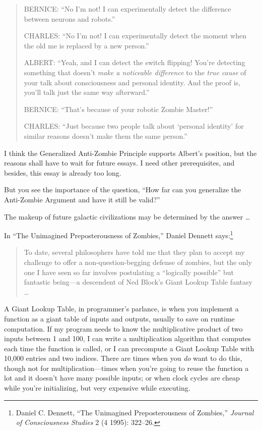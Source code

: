 \begin{quotation}
{
 BERNICE: ``No I'm not! I can
experimentally detect the difference between neurons and
robots.''}

{
 CHARLES: ``No I'm not! I can
experimentally detect the moment when the old me is replaced by a new
person.''}

{
 ALBERT: ``Yeah, and I can detect the switch
flipping! You're detecting something that
doesn't \textit{make a noticeable difference} to the
\textit{true cause} of your talk about consciousness and personal
identity. And the proof is, you'll talk just the same
way afterward.''}

{
 BERNICE: ``That's because of your
robotic Zombie Master!''}

{
 CHARLES: ``Just because two people talk about
`personal identity' for similar reasons
 doesn't make them the same person.''}
\end{quotation}

{
 I think the Generalized Anti-Zombie Principle supports
Albert's position, but the reasons shall have to wait
for future essays. I need other prerequisites, and besides, this essay
is already too long.}

{
 But you see the importance of the question, ``How
far can you generalize the Anti-Zombie Argument and have it still be
valid?''}

{
 The makeup of future galactic civilizations may be determined by
the answer \ldots}

\myendsectiontext


\bigskip


{
 In ``The Unimagined Preposterousness of
Zombies,'' Daniel Dennett says:\footnote{Daniel C. Dennett, ``The Unimagined
Preposterousness of Zombies,'' \textit{Journal of
Consciousness Studies} 2 (4 1995): 322--26.}}

\begin{quote}
{
 To date, several philosophers have told me that they plan to
accept my challenge to offer a non-question-begging defense of zombies,
but the only one I have seen so far involves postulating a
``logically possible'' but fantastic
being---a descendent of Ned Block's Giant Lookup Table
fantasy \ldots}
\end{quote}

{
 A Giant Lookup Table, in programmer's parlance, is
when you implement a function as a giant table of inputs and outputs,
usually to save on runtime computation. If my program needs to know the
multiplicative product of two inputs between 1 and 100, I can write a
multiplication algorithm that computes each time the function is
called, or I can precompute a Giant Lookup Table with 10,000 entries
and two indices. There are times when you \textit{do} want to do this,
though not for multiplication---times when you're going
to reuse the function a lot and it doesn't have many
possible inputs; or when clock cycles are cheap while
you're initializing, but very expensive while
executing.}

